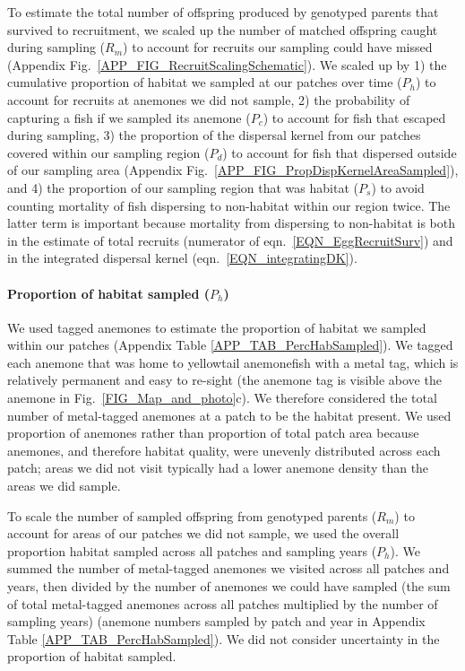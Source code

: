 \documentclass[12pt, oneside]{article}   	%
\begin{document}
To estimate the total number of offspring produced by genotyped parents that survived to recruitment, we scaled up the number of matched offspring caught during sampling ($R_m$) to account for recruits our sampling could have missed (Appendix Fig.\ \ref{APP_FIG_RecruitScalingSchematic}). We scaled up by 1) the cumulative proportion of habitat we sampled at our patches over time ($P_h$) to account for recruits at anemones we did not sample, 2) the probability of capturing a fish if we sampled its anemone ($P_c$) to account for fish that escaped during sampling, 3) the proportion of the dispersal kernel from our patches covered within our sampling region ($P_d$) to account for fish that dispersed outside of our sampling area (Appendix Fig.\ \ref{APP_FIG_PropDispKernelAreaSampled}), and 4) the proportion of our sampling region that was habitat ($P_s$) to avoid counting mortality of fish dispersing to non-habitat within our region twice. The latter term is important because mortality from dispersing to non-habitat is both in the estimate of total recruits (numerator of eqn.\ \ref{EQN_EggRecruitSurv}) and in the integrated dispersal kernel (eqn.\ \ref{EQN_integratingDK}). 

\paragraph*{Proportion of habitat sampled ($P_h$)} 

We used tagged anemones to estimate the proportion of habitat we sampled within our patches (Appendix Table \ref{APP_TAB_PercHabSampled}). We tagged each anemone that was home to yellowtail anemonefish with a metal tag, which is relatively permanent and easy to re-sight (the anemone tag is visible above the anemone in Fig.\ \ref{FIG_Map_and_photo}c). We therefore considered the total number of metal-tagged anemones at a patch to be the habitat present. We used proportion of anemones rather than proportion of total patch area because anemones, and therefore habitat quality, were unevenly distributed across each patch; areas we did not visit typically had a lower anemone density than the areas we did sample. 

To scale the number of sampled offspring from genotyped parents ($R_m$) to account for areas of our patches we did not sample, we used the overall proportion habitat sampled across all patches and sampling years ($P_h$). We summed the number of metal-tagged anemones we visited across all patches and years, then divided by the number of anemones we could have sampled (the sum of total metal-tagged anemones across all patches multiplied by the number of sampling years) (anemone numbers sampled by patch and year in Appendix Table \ref{APP_TAB_PercHabSampled}). We did not consider uncertainty in the proportion of habitat sampled.
\end{document}
